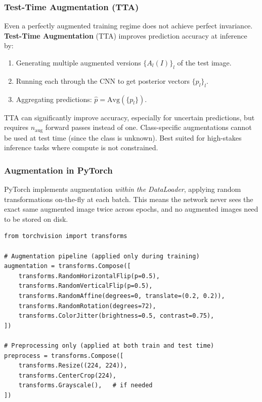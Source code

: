 \documentclass[11pt,a4paper]{article}
\newcommand{\term}[1]{\textcolor{DefGreen}{\textbf{#1}}}
\begin{document}
\subsubsection{Test-Time Augmentation (TTA)}

Even a perfectly augmented training regime does not achieve perfect invariance. \term{Test-Time Augmentation} (TTA) improves prediction accuracy at inference by:
\begin{enumerate}
  \item Generating multiple augmented versions $\{A_l(I)\}_l$ of the test image.
  \item Running each through the CNN to get posterior vectors $\{p_l\}_l$.
  \item Aggregating predictions: $\hat{p} = \mathrm{Avg}(\{p_l\})$.
\end{enumerate}

\begin{notebox}
TTA can significantly improve accuracy, especially for uncertain predictions, but requires $n_{\text{aug}}$ forward passes instead of one. Class-specific augmentations cannot be used at test time (since the class is unknown). Best suited for high-stakes inference tasks where compute is not constrained.
\end{notebox}

\subsubsection{Augmentation in PyTorch}

PyTorch implements augmentation \emph{within the DataLoader}, applying random transformations on-the-fly at each batch. This means the network never sees the exact same augmented image twice across epochs, and no augmented images need to be stored on disk.

\begin{lstlisting}[caption={Stacking augmentation transforms in PyTorch}]
from torchvision import transforms

# Augmentation pipeline (applied only during training)
augmentation = transforms.Compose([
    transforms.RandomHorizontalFlip(p=0.5),
    transforms.RandomVerticalFlip(p=0.5),
    transforms.RandomAffine(degrees=0, translate=(0.2, 0.2)),
    transforms.RandomRotation(degrees=72),
    transforms.ColorJitter(brightness=0.5, contrast=0.75),
])

# Preprocessing only (applied at both train and test time)
preprocess = transforms.Compose([
    transforms.Resize((224, 224)),
    transforms.CenterCrop(224),
    transforms.Grayscale(),   # if needed
])
\end{lstlisting}
\end{document}
